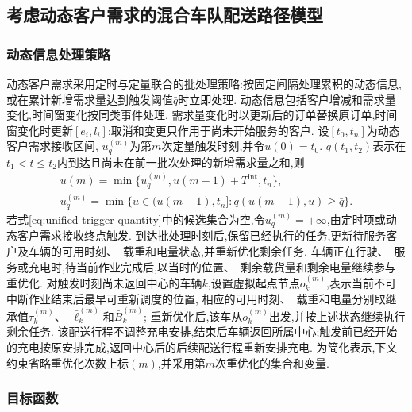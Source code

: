 \documentclass{setp-new}
\begin{document}
\subsection{考虑动态客户需求的混合车队配送路径模型}

\subsubsection{动态信息处理策略}

动态客户需求采用定时与定量联合的批处理策略:按固定间隔处理累积的动态信息,或在累计新增需求量达到触发阈值$\bar q$时立即处理\cite{ref:yang2022}.
动态信息包括客户增减和需求量变化\cite{ref:zhang2022},时间窗变化按同类事件处理.
需求量变化时以更新后的订单替换原订单,时间窗变化时更新$[e_i,l_i]$;取消和变更只作用于尚未开始服务的客户.
设$[t_0,t_n]$为动态客户需求接收区间, $u_q^{(m)}$为第$m$次定量触发时刻,并令$u(0)=t_0$.
$q(t_1,t_2)$表示在$t_1<t\le t_2$内到达且尚未在前一批次处理的新增需求量之和,则
\begin{gather}
u(m)
=\min\{u_q^{(m)},u(m-1)+T^{\mathrm{int}},t_n\},
\label{eq:unified-trigger-time}\\
u_q^{(m)}
=\min\{u\in(u(m-1),t_n]:q(u(m-1),u)\ge\bar q\}.
\label{eq:unified-trigger-quantity}
\end{gather}
若式\eqref{eq:unified-trigger-quantity}中的候选集合为空,令$u_q^{(m)}=+\infty$,由定时项或动态客户需求接收终点触发.
到达批处理时刻后,保留已经执行的任务,更新待服务客户及车辆的可用时刻、~载重和电量状态,并重新优化剩余任务.
车辆正在行驶、~服务或充电时,待当前作业完成后,以当时的位置、~剩余载货量和剩余电量继续参与重优化.
对触发时刻尚未返回中心的车辆$k$,设置虚拟起点节点$o_k^{(m)}$,表示当前不可中断作业结束后最早可重新调度的位置,
相应的可用时刻、~载重和电量分别取继承值$\bar\tau_k^{(m)}$、~$\bar\ell_k^{(m)}$和$\bar B_k^{(m)}$;
重新优化后,该车从$o_k^{(m)}$出发,并按上述状态继续执行剩余任务.
该配送行程不调整充电安排,结束后车辆返回所属中心;触发前已经开始的充电按原安排完成,返回中心后的后续配送行程重新安排充电.
为简化表示,下文约束省略重优化次数上标$(m)$,并采用第$m$次重优化的集合和变量.

\subsubsection{目标函数}
\end{document}
